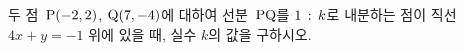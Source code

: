 두 점~$\mathrm{P}(-2{,}\mkern3mu\mathopen{}2)$, $\mathrm{Q}(7{,}\mkern3mu\mathopen{}-4)$에 대하여 선분~$\mathrm{PQ}$를 $1\mkern3mu :\mkern3mu k$로 내분하는 점이 직선~$4x+y=-1$ 위에 있을 때, 실수 $k$의 값을 구하시오.
